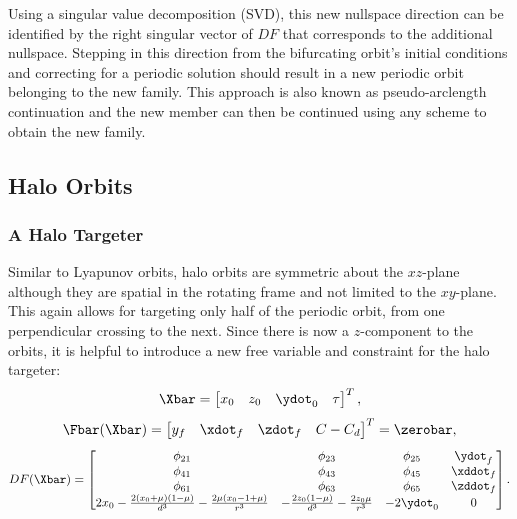 Using a singular value decomposition (SVD), this new nullspace direction can be identified by the
right singular vector of $DF$ that corresponds to the additional nullspace. Stepping in this
direction from the bifurcating orbit's initial conditions and correcting for a periodic solution
should result in a new periodic orbit belonging to the new family. This approach is also known as
pseudo-arclength continuation and the new member can then be continued using any scheme to obtain
the new family.

\subsection{Halo Orbits}
\subsubsection{A Halo Targeter}
Similar to Lyapunov orbits, halo orbits are symmetric about the $xz$-plane although they are
spatial in the rotating frame and not limited to the $xy$-plane. This again allows for
targeting only half of the periodic orbit, from one perpendicular crossing to the next. Since there
is now a $z$-component to the orbits, it is helpful to introduce a new free variable and constraint
for the halo targeter:
\begin{equation}
    \Xbar=\begin{bmatrix}   x_{0}   &   z_{0}   &   \ydot_{0}   &   \tau    \end{bmatrix}^{T},
    \label{eq:halofreevar}
\end{equation}
\begin{equation}
    \Fbar(\Xbar)=\begin{bmatrix}    y_{f}   &   \xdot_{f}   &   \zdot_{f}   &   C-C_{d} \end{bmatrix}^{T}=\zerobar,
    \label{eq:haloconst}
\end{equation}
\begin{equation}
    DF(\Xbar)=\begin{bmatrix}   \phi_{21}                                                                   &   \phi_{23}                                               &   \phi_{25}                                   &   \ydot_{f}                               \\
                                \phi_{41}                                                                   &   \phi_{43}                                               &   \phi_{45}                                   &   \xddot_{f}                              \\
                                \phi_{61}                                                                   &   \phi_{63}                                               &   \phi_{65}                                   &   \zddot_{f}                              \\
                                2x_{0}-\frac{2(x_{0}+\mu)(1-\mu)}{d^{3}}-\frac{2\mu(x_{0}-1+\mu)}{r^{3}}    &   -\frac{2z_{0}(1-\mu)}{d^{3}}-\frac{2z_{0}\mu}{r^{3}}    &   -2\ydot_{0}                                 &   0                                       \end{bmatrix}.
    \label{eq:halojacobian}
\end{equation}
